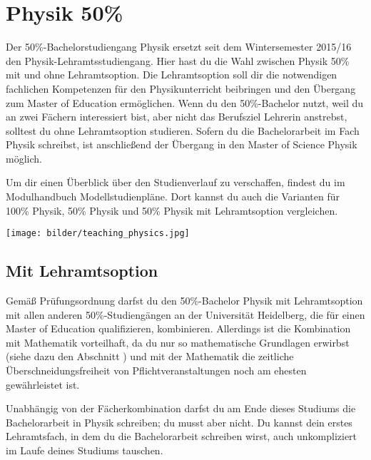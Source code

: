 \section{Physik 50\%}

Der 50\%-Bachelorstudiengang Physik ersetzt seit dem Wintersemester 2015/16 den Physik-Lehramtsstudiengang. Hier hast du die Wahl zwischen Physik 50\% mit und ohne Lehramtsoption. 
Die Lehramtsoption soll dir die notwendigen fachlichen Kompetenzen für den Physikunterricht beibringen und den Übergang zum Master of Education ermöglichen.
Wenn du den 50\%-Bachelor nutzt, weil du an zwei Fächern interessiert bist, aber nicht das Berufsziel Lehrerin anstrebst, solltest du ohne Lehramtsoption studieren. Sofern du die Bachelorarbeit im Fach Physik schreibst, ist anschließend der Übergang in den Master of Science Physik möglich.

Um dir einen Überblick über den Studienverlauf zu verschaffen, findest du im Modulhandbuch Modellstudienpläne. Dort kannst du auch die Varianten für 100\% Physik, 50\% Physik und 50\% Physik mit Lehramtsoption vergleichen.

\begin{figure*}[b]
    \centering
    \texttt{[image: bilder/teaching\_physics.jpg]}
\end{figure*}

\subsection{Mit Lehramtsoption}

Gemäß Prüfungsordnung darfst du den 50\%-Bachelor Physik mit Lehramtsoption mit allen anderen 50\%-Studiengängen an der Universität Heidelberg, die für einen Master of Education qualifizieren, kombinieren. Allerdings ist die Kombination mit Mathematik vorteilhaft, da du nur so mathematische Grundlagen erwirbst (siehe dazu den Abschnitt ) und mit der Mathematik die zeitliche Überschneidungsfreiheit von Pflichtveranstaltungen noch am ehesten gewährleistet ist.

Unabhängig von der Fächerkombination darfst du am Ende dieses Studiums die Bachelorarbeit in Physik schreiben; du musst aber nicht. Du kannst dein erstes Lehramtsfach, in dem du die Bachelorarbeit schreiben wirst, auch unkompliziert im Laufe deines Studiums tauschen.

